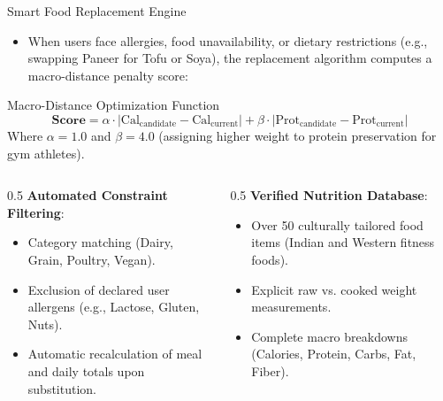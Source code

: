 \documentclass[aspectratio=169,10pt]{beamer}
\begin{document}
\begin{frame}{Smart Food Replacement Engine}
  \begin{itemize}
    \item When users face allergies, food unavailability, or dietary restrictions (e.g., swapping Paneer for Tofu or Soya), the replacement algorithm computes a macro-distance penalty score:
  \end{itemize}
  \begin{block}{Macro-Distance Optimization Function}
    \[
      \mathbf{\text{Score}} = \alpha \cdot |\text{Cal}_{\text{candidate}} - \text{Cal}_{\text{current}}| + \beta \cdot |\text{Prot}_{\text{candidate}} - \text{Prot}_{\text{current}}|
    \]
    Where $\alpha = 1.0$ and $\beta = 4.0$ (assigning higher weight to protein preservation for gym athletes).
  \end{block}
  \begin{columns}[T]
    \begin{column}{0.5\textwidth}
      \textbf{Automated Constraint Filtering}:
      \begin{itemize}
        \item Category matching (Dairy, Grain, Poultry, Vegan).
        \item Exclusion of declared user allergens (e.g., Lactose, Gluten, Nuts).
        \item Automatic recalculation of meal and daily totals upon substitution.
      \end{itemize}
    \end{column}
    \begin{column}{0.5\textwidth}
      \textbf{Verified Nutrition Database}:
      \begin{itemize}
        \item Over 50 culturally tailored food items (Indian and Western fitness foods).
        \item Explicit raw vs. cooked weight measurements.
        \item Complete macro breakdowns (Calories, Protein, Carbs, Fat, Fiber).
      \end{itemize}
    \end{column}
  \end{columns}
\end{frame}
\end{document}
